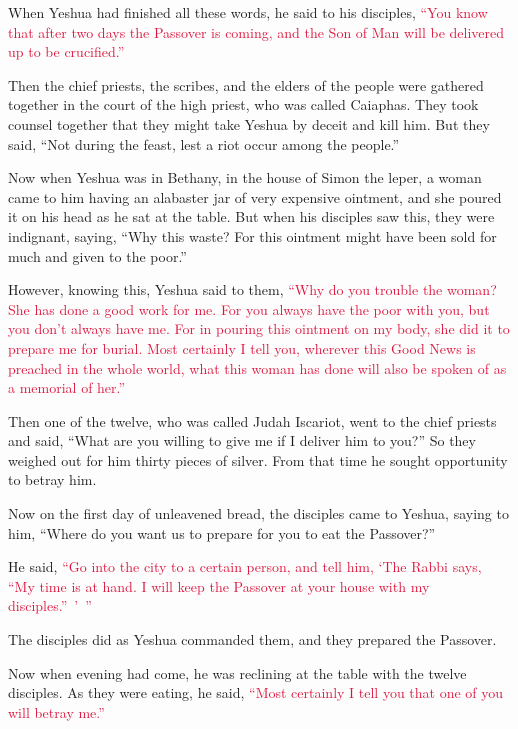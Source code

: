\mychapter{} \myverse*{}When Yeshua had finished all these words, he said to his disciples,
\myverse{}\textcolor{crimson}{“You know that after two days the Passover is coming, and the Son of Man
	will be delivered up to be crucified.”}

\myverse{}Then the chief priests, the scribes, and the elders of the people
were gathered together in the court of the high priest, who was called Caiaphas.
\myverse{}They took counsel together that they might take Yeshua by deceit and kill him.
\myverse{}But they said, “Not during the feast, lest a riot occur among the people.”

\myverse{}Now when Yeshua was in Bethany, in the house of Simon the leper,
\myverse{}a woman came to him having an alabaster jar of very expensive ointment, and
she poured it on his head as he sat at the table.
\myverse{}But when his disciples saw this, they were indignant, saying, “Why this waste?
\myverse{}For this ointment might have been sold for much and given to the poor.”

\myverse{}However, knowing this, Yeshua said to them,
\textcolor{crimson}{“Why do you trouble the woman? She has done a good work for me.
}
\myverse{}\textcolor{crimson}{For you always have the poor with you, but you don’t always have me.
}
\myverse{}\textcolor{crimson}{For in pouring this ointment on my body, she did it to prepare me for
	burial.
}
\myverse{}\textcolor{crimson}{Most certainly I tell you, wherever this Good News is preached in the
	whole world, what this woman has done will also be spoken of as a memorial of her.”}

\myverse{}Then one of the twelve, who was called Judah Iscariot, went
to the chief priests
\myverse{}and said, “What are you willing to give me if I deliver him to you?” So they
weighed out for him thirty pieces of silver.
\myverse{}From that time he sought opportunity to betray him.

\myverse{}Now on the first day of unleavened bread, the disciples came
to Yeshua, saying to him, “Where do you want us to prepare for you to eat the Passover?”

\myverse{}He said,
\textcolor{crimson}{“Go into the city to a certain person, and tell him, ‘The Rabbi says, “My time is at hand. I will
	keep the Passover at your house with my disciples.” ’ ”}

\myverse{}The disciples did as Yeshua commanded them, and they prepared
the Passover.

\myverse{}Now when evening had come, he was reclining at the table with
the twelve disciples.
\myverse{}As they were eating, he said,
\textcolor{crimson}{“Most certainly I tell you that one of you will betray me.”}

